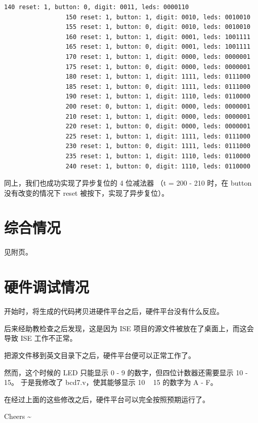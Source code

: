 \documentclass[11pt,a4paper]{article}
\begin{document}
\begin{Verbatim}[fontsize=\scriptsize]
                 140 reset: 1, button: 0, digit: 0011, leds: 0000110
                 150 reset: 1, button: 1, digit: 0010, leds: 0010010
                 155 reset: 1, button: 0, digit: 0010, leds: 0010010
                 160 reset: 1, button: 1, digit: 0001, leds: 1001111
                 165 reset: 1, button: 0, digit: 0001, leds: 1001111
                 170 reset: 1, button: 1, digit: 0000, leds: 0000001
                 175 reset: 1, button: 0, digit: 0000, leds: 0000001
                 180 reset: 1, button: 1, digit: 1111, leds: 0111000
                 185 reset: 1, button: 0, digit: 1111, leds: 0111000
                 190 reset: 1, button: 1, digit: 1110, leds: 0110000
                 200 reset: 0, button: 1, digit: 0000, leds: 0000001
                 210 reset: 1, button: 1, digit: 0000, leds: 0000001
                 220 reset: 1, button: 0, digit: 0000, leds: 0000001
                 225 reset: 1, button: 1, digit: 1111, leds: 0111000
                 230 reset: 1, button: 0, digit: 1111, leds: 0111000
                 235 reset: 1, button: 1, digit: 1110, leds: 0110000
                 240 reset: 1, button: 0, digit: 1110, leds: 0110000
\end{Verbatim}

同上，我们也成功实现了异步复位的 4 位减法器
（t = 200 - 210 时，在 button 没有改变的情况下 reset 被按下，实现了异步复位）。

\section{综合情况}
见附页。

\section{硬件调试情况}
开始时，将生成的代码拷贝进硬件平台之后，硬件平台没有什么反应。

后来经助教检查之后发现，这是因为 ISE 项目的源文件被放在了桌面上，而这会导致 ISE 工作不正常。

把源文件移到英文目录下之后，硬件平台便可以正常工作了。

然而，这个时候的 LED 只能显示 0 - 9 的数字，但四位计数器还需要显示 10 - 15。
于是我修改了 bcd7.v，使其能够显示 10 ~ 15 的数字为 A - F。

在经过上面的这些修改之后，硬件平台可以完全按照预期运行了。

Cheers \textasciitilde




\end{document}
